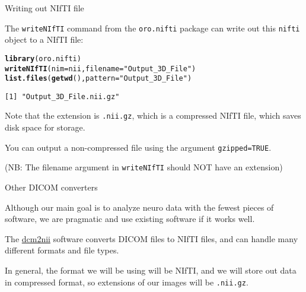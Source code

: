 \documentclass[11pt]{beamer}\usepackage[]{graphicx}\usepackage[]{color}
\makeatletter
\newcommand{\hlstr}[1]{\textcolor[rgb]{0.192,0.494,0.8}{#1}}%
\newcommand{\hlstd}[1]{\textcolor[rgb]{0.345,0.345,0.345}{#1}}%
\newcommand{\hlkwc}[1]{\textcolor[rgb]{0.333,0.667,0.333}{#1}}%
\newcommand{\hlkwd}[1]{\textcolor[rgb]{0.737,0.353,0.396}{\textbf{#1}}}%
\newenvironment{kframe}{%
 \def\at@end@of@kframe{}%
 \ifinner\ifhmode%
  \def\at@end@of@kframe{\end{minipage}}%
  \begin{minipage}{\columnwidth}%
 \fi\fi%
 \def\FrameCommand##1{\hskip\@totalleftmargin \hskip-\fboxsep
 \colorbox{shadecolor}{##1}\hskip-\fboxsep
     \hskip-\linewidth \hskip-\@totalleftmargin \hskip\columnwidth}%
 \MakeFramed {\advance\hsize-\width
   \@totalleftmargin\z@ \linewidth\hsize
   \@setminipage}}%
 {\par\unskip\endMakeFramed%
 \at@end@of@kframe}
\newenvironment{knitrout}{}{} %
\makeatother
\begin{document}
\begin{frame}[fragile]{Writing out NIfTI file}

The \verb|writeNIfTI| command from the \verb|oro.nifti| package can write out this \verb|nifti| object to a NIfTI file:

\begin{knitrout}
\color{fgcolor}\begin{kframe}
\begin{alltt}
\hlkwd{library}\hlstd{(oro.nifti)}
\hlkwd{writeNIfTI}\hlstd{(}\hlkwc{nim} \hlstd{= nii,} \hlkwc{filename} \hlstd{=} \hlstr{"Output_3D_File"}\hlstd{)}
\hlkwd{list.files}\hlstd{(}\hlkwd{getwd}\hlstd{(),} \hlkwc{pattern} \hlstd{=} \hlstr{"Output_3D_File"}\hlstd{)}
\end{alltt}
\begin{verbatim}
[1] "Output_3D_File.nii.gz"
\end{verbatim}
\end{kframe}
\end{knitrout}
Note that the extension is \verb|.nii.gz|, which is a compressed NIfTI file, which saves disk space for storage.

You can output a non-compressed file using the argument \verb|gzipped=TRUE|.

(NB: The filename argument in \verb|writeNIfTI| should NOT have an extension)

\end{frame}

\begin{frame}[fragile]{Other DICOM converters}

Although our main goal is to analyze neuro data with the fewest pieces of software, we are pragmatic and use existing software if it works well.

The \href{http://www.mccauslandcenter.sc.edu/mricro/mricron/dcm2nii.html}{dcm2nii} software converts DICOM files to NIfTI files, and can handle many different formats and file types.

In general, the format we will be using will be NIfTI, and we will store out data in compressed format, so extensions of our images will be \verb|.nii.gz|.

\end{frame}
\end{document}
